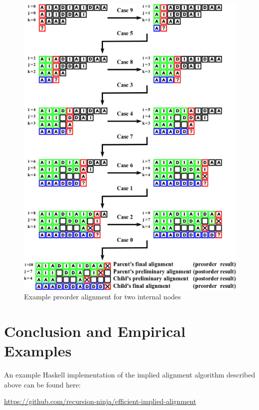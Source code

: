 \documentclass[11pt]{article}
\begin{document}
\begin{figure}[h]
	\caption{Example preorder alignment for two internal nodes}
	\label{Fig:ExamplePreorder}
	\vspace{2ex}
	\includegraphics{example-preorder.png}
\end{figure}

\restoregeometry

\section{Conclusion and Empirical Examples}

An example Haskell implementation of the implied alignment algorithm described above can be found here: 

\centerline{\url{https://github.com/recursion-ninja/efficient-implied-alignment}}
\end{document}
